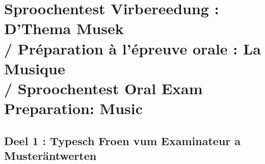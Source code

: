 \vspace{1.5em}

\section[Sproochentest Virbereedung: D'Thema Musek / Sproochentest Oral Prep]{Sproochentest Virbereedung : D'Thema Musek \\/ Préparation à l'épreuve orale : La Musique \\/ Sproochentest Oral Exam Preparation: Music}

\subsection{Deel 1 : Typesch Froen vum Examinateur a Musteräntwerten}

